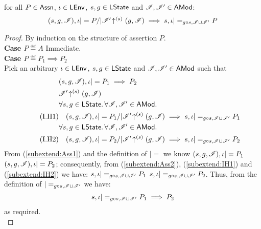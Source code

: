 %
\begin{lemma}[]\label{lem:extend1}
for all $P \in \textsf{Assn}$, $\iota \in \textsf{LEnv}$, $s, g \in \textsf{LState}$ and $\mathscr{I}, \mathscr{I}' \in \textsf{AMod}$: 
% 
\[
\begin{array}{@{} l @{}}
	(s, g, \lmod), \lenv |= P /| \expandsAM{\lmod'}{s}{g}{\lmod}
	\implies  s, \lenv |=_{g \composeL s, \lmod \cup \lmod'} P
\end{array}
\]
%
\begin{proof}
By induction on the structure of assertion $P$.	\\

\noindent\textbf{Case $P \eqdef A$\quad} Immediate.\\
\noindent\textbf{Case $P \eqdef P_1 \implies P_2$} \\
Pick an arbitrary $\iota \in \textsf{LEnv}$, $s, g \in \textsf{LState}$ and $\mathscr{I}, \mathscr{I}' \in \textsf{AMod}$ such that
%
\begin{align}
	& (s, g, \lmod), \lenv |= P_1 \implies P_2 \label{subextend:Ass1}\\
%	
	& \expandsAM{\lmod'}{s}{g}{\lmod} \label{subextend:Ass2}\\
%	
	& \for{s, g \in \LStates} \for{\lmod, \lmod' \in \AMods} \nonumber\\
	\tag{I.H1} & \quad (s, g, \lmod), \lenv |= P_1 /| \expandsAM{\lmod'}{s}{g}{\lmod}
	\implies s, \lenv |=_{g \composeL s, \lmod \cup \lmod'} P_1
	\label{subextend:IH1}\\ 
%
	& \for{s, g \in \LStates} \for{\lmod, \lmod' \in \AMods} \nonumber\\
	\tag{I.H2} & \quad (s, g, \lmod), \lenv |= P_2 /| \expandsAM{\lmod'}{s}{g}{\lmod}
	\implies s, \lenv |=_{g \composeL s, \lmod \cup \lmod'} P_2
	\label{subextend:IH2}
%	
\end{align}
%
From (\ref{subextend:Ass1}) and the definition of $|=$ we know $(s, g, \mathscr{I}), \iota |= P_1$  $(s, g, \mathscr{I}), \iota |= P_2$; consequently, from (\ref{subextend:Ass2}), (\ref{subextend:IH1}) and (\ref{subextend:IH2}) we have: $s, \iota |=_{g \circ s, \mathscr{I} \cup \mathscr{I}'} P_1$  $s, \iota |=_{g \circ s, \mathscr{I} \cup \mathscr{I}'} P_2$. Thus, from the definition of $|=_{g \circ s, \mathscr{I} \cup \mathscr{I}'}$ we have:
%
\begin{align*}
	s, \iota |=_{g \circ s, \mathscr{I} \cup \mathscr{I}'} P_1 \implies P_2
\end{align*}
%
as required.\\


\end{proof}
\end{lemma}
